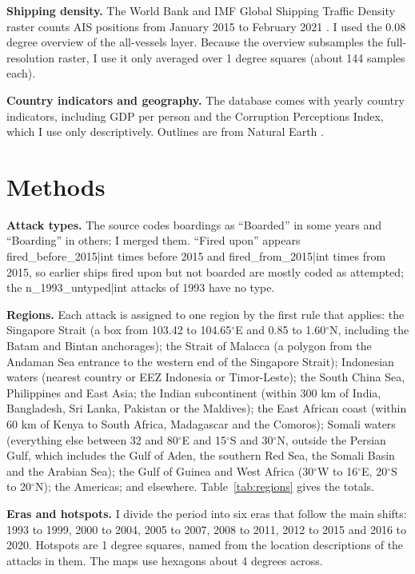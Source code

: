\documentclass[11pt,a4paper]{article}
\begin{document}
\textbf{Shipping density.} The World Bank and IMF Global Shipping Traffic Density raster counts AIS positions from January 2015 to February 2021 \citep{wbships,cerdeiro}. I used the 0.08 degree overview of the all-vessels layer. Because the overview subsamples the full-resolution raster, I use it only averaged over 1 degree squares (about 144 samples each).

\textbf{Country indicators and geography.} The database comes with yearly country indicators, including GDP per person and the Corruption Perceptions Index, which I use only descriptively. Outlines are from Natural Earth \citep{naturalearth}.

\section{Methods}
\textbf{Attack types.} The source codes boardings as ``Boarded'' in some years and ``Boarding'' in others; I merged them. ``Fired upon'' appears {{fired_before_2015|int}} times before 2015 and {{fired_from_2015|int}} times from 2015, so earlier ships fired upon but not boarded are mostly coded as attempted; the {{n_1993_untyped|int}} attacks of 1993 have no type.

\textbf{Regions.} Each attack is assigned to one region by the first rule that applies: the Singapore Strait (a box from 103.42 to 104.65$^\circ$E and 0.85 to 1.60$^\circ$N, including the Batam and Bintan anchorages); the Strait of Malacca (a polygon from the Andaman Sea entrance to the western end of the Singapore Strait); Indonesian waters (nearest country or EEZ Indonesia or Timor-Leste); the South China Sea, Philippines and East Asia; the Indian subcontinent (within 300 km of India, Bangladesh, Sri Lanka, Pakistan or the Maldives); the East African coast (within 60 km of Kenya to South Africa, Madagascar and the Comoros); Somali waters (everything else between 32 and 80$^\circ$E and 15$^\circ$S and 30$^\circ$N, outside the Persian Gulf, which includes the Gulf of Aden, the southern Red Sea, the Somali Basin and the Arabian Sea); the Gulf of Guinea and West Africa (30$^\circ$W to 16$^\circ$E, 20$^\circ$S to 20$^\circ$N); the Americas; and elsewhere. Table~\ref{tab:regions} gives the totals.

\textbf{Eras and hotspots.} I divide the period into six eras that follow the main shifts: 1993 to 1999, 2000 to 2004, 2005 to 2007, 2008 to 2011, 2012 to 2015 and 2016 to 2020. Hotspots are 1 degree squares, named from the location descriptions of the attacks in them. The maps use hexagons about 4 degrees across.
\end{document}

